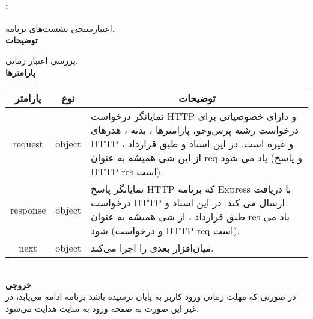 \paragraph{:}
اعتبارسنجی نشست‌های برنامه.
\\
\textbf{توضیحات}
\hr
\begin{flushleft}
	\framebox[.9\textwidth][l]{
		\lr{
			\textcolor{type}{void}
			\textcolor{func}{sessionChecker}
			\textcolor{symb}{(}
			\textcolor{type}{object}
			\textcolor{arg}{request}
			\textcolor{symb}{,}
			\textcolor{type}{object}
			\textcolor{arg}{response}
			\textcolor{symb}{,}
			\textcolor{type}{object}
			\textcolor{arg}{next}
			\textcolor{symb}{);}
		}
	}
\end{flushleft}
بررسی اعتبار زمانی.
\\
\textbf{پارامترها}
\hr \\[10pt]
\begin{tabular}{|m{4cm}|m{3cm}|m{10cm}|}
	\hline
	\multicolumn{1}{|c}{پارامتر}
	&
	\multicolumn{1}{|c}{نوع}
	&
	\multicolumn{1}{|c|}{توضیحات}
	\\
	\hline
	\multicolumn{1}{|c}{request}
	&
	\multicolumn{1}{|c|}{object}
	&
	نمایانگر درخواست HTTP و دارای خصوصیاتی برای درخواست رشته پرس‌و‌جو، پارامترها ، بدنه ، هدرهای HTTP و غیره است.
	در این اسناد و طبق قرارداد ، از این شی همیشه به عنوان req یاد می شود (و پاسخ HTTP res است).
	\\
	\hline
	\multicolumn{1}{|c}{response}
	&
	\multicolumn{1}{|c|}{object}
	&
	نمایانگر پاسخ HTTP که برنامه Express با دریافت درخواست HTTP ارسال می کند.
	در این اسناد و طبق قرارداد ، از شی همیشه به عنوان res یاد می شود (و درخواست HTTP req است).
	\\
	\hline
	\multicolumn{1}{|c}{next}
	&
	\multicolumn{1}{|c|}{object}
	&
 میان‌افزار بعدی را اجرا می‌کند.
	\\
	\hline
\end{tabular}
\\[10pt]
\textbf{خروجی}
\hr \\
در صورتی که مهلت زمانی ورود کاربر به پایان نرسیده باشد برنامه ادامه می‌یابد، در غیر این صورت به صفحه ورود به سایت هدایت می‌شود.

